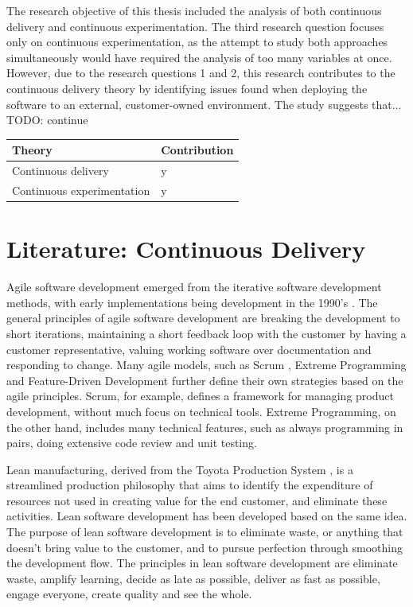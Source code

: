 \documentclass[english]{tktltiki2}
\theoremstyle{definition}
\theoremstyle{remark}
\begin{document}
The research objective of this thesis included the analysis of both continuous delivery and continuous experimentation. The third research question focuses only on continuous experimentation, as the attempt to study both approaches simultaneously would have required the analysis of too many variables at once. However, due to the research questions 1 and 2, this research contributes to the continuous delivery theory by identifying issues found when deploying the software to an external, customer-owned environment. The study suggests that... TODO: continue

\begin{center}
    \begin{tabular}{ | l | p{5cm} |} 
    \hline
    Theory & Contribution \\ \hline
    Continuous delivery & y \\ \hline
    Continuous experimentation & y \\ \hline
    \hline
    \end{tabular}
\end{center}

\section{Literature: Continuous Delivery}
Agile software development emerged from the iterative software development methods, with early implementations being development in the 1990's \cite{dybaa2008empirical}. The general principles of agile software development are breaking the development to short iterations, maintaining a short feedback loop with the customer by having a customer representative, valuing working software over documentation and responding to change. Many agile models, such as Scrum \cite{schwaber2002gile}, Extreme Programming \cite{beck2000extreme} and Feature-Driven Development \cite{palmer2001practical} further define their own strategies based on the agile principles. Scrum, for example, defines a framework for managing product development, without much focus on technical tools. Extreme Programming, on the other hand, includes many technical features, such as always programming in pairs, doing extensive code review and unit testing.

Lean manufacturing, derived from the Toyota Production System \cite{ono1988toyota}, is a streamlined production philosophy that aims to identify the expenditure of resources not used in creating value for the end customer, and eliminate these activities. Lean software development \cite{poppendieck2003lean} has been developed based on the same idea. The purpose of lean software development is to eliminate waste, or anything that doesn't bring value to the customer, and to pursue perfection through smoothing the development flow. The principles in lean software development are eliminate waste, amplify learning, decide as late as possible, deliver as fast as possible, engage everyone, create quality and see the whole. 
\end{document}
